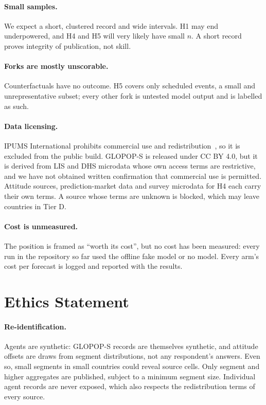 \documentclass[11pt]{article}
\begin{document}
\paragraph{Small samples.} We expect a short, clustered record and wide intervals. H1 may end underpowered, and H4 and H5 will very likely have small $n$. A short record proves integrity of publication, not skill.

\paragraph{Forks are mostly unscorable.} Counterfactuals have no outcome. H5 covers only scheduled events, a small and unrepresentative subset; every other fork is untested model output and is labelled as such.

\paragraph{Data licensing.} IPUMS International prohibits commercial use and redistribution~\citep{ipumsi}, so it is excluded from the public build. GLOPOP-S is released under CC BY 4.0, but it is derived from LIS and DHS microdata whose own access terms are restrictive, and we have not obtained written confirmation that commercial use is permitted. Attitude sources, prediction-market data and survey microdata for H4 each carry their own terms. A source whose terms are unknown is blocked, which may leave countries in Tier D.

\paragraph{Cost is unmeasured.} The position is framed as ``worth its cost'', but no cost has been measured: every run in the repository so far used the offline fake model or no model. Every arm's cost per forecast is logged and reported with the results.

\section{Ethics Statement}

\paragraph{Re-identification.} Agents are synthetic: GLOPOP-S records are themselves synthetic, and attitude offsets are draws from segment distributions, not any respondent's answers. Even so, small segments in small countries could reveal source cells. Only segment and higher aggregates are published, subject to a minimum segment size. Individual agent records are never exposed, which also respects the redistribution terms of every source.
\end{document}

